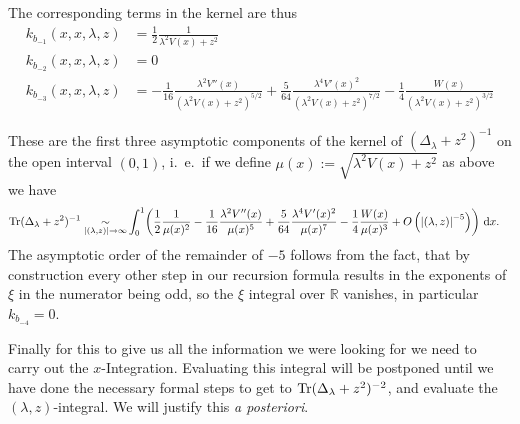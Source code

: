 The corresponding terms in the kernel are thus
\begin{align}
  k_{b_{-1}}(x,x,\lambda,z) &= \frac{1}{2} \frac{1}{\lambda^2 V(x) + z^2} \\
  k_{b_{-2}}(x,x,\lambda,z) &= 0 \\
  k_{b_{-3}}(x,x,\lambda,z) &= - \frac{1}{16} \frac{\lambda^2 V''(x)}{(\lambda^2
    V(x) + z^2)^{5/2}} + \frac{5}{64} \frac{\lambda^4 V'(x)^2}{(\lambda^2V(x)
    + z^2)^{7/2}} -\frac{1}{4}\frac{W(x)}{(\lambda^2 V(x) + z^2)^{3/2}}
  \label{eqn:coeff-kernel}
\end{align}

These are the first three asymptotic components of the kernel of
$(\Delta_\lambda + z^2)^{-1}$ on the open interval $(0,1)$, i.~e.\ if we define
$\mu(x) := \sqrt{\lambda^2 V(x) + z^2}$ as above we have
\begin{align*}
  \Tr(\Delta_\lambda + z^2)^{-1} \SimAs{\Abs{(\lambda, z)}\to\infty}&
   \Int{x}{\left(
      \frac12\frac1{\mu(x)^{2}}
     -\frac1{16}\frac{\lambda^2 V''(x)}{\mu(x)^5}
     +\frac{5}{64}\frac{\lambda^4V'(x)^2}{\mu(x)^7}
     -\frac14\frac{W(x)}{\mu(x)^3}
     +O\left(\Abs{(\lambda, z)}^{-5}\right)
   \right)}.
\end{align*}
The asymptotic order of the remainder of $-5$ follows from the fact, that by
construction every other step in our recursion formula results in the exponents
of $\xi$ in the numerator being odd, so the $\xi$ integral over $\mathbb{R}$
vanishes, in particular $k_{b_{-4}} = 0$.

Finally for this to give us all the information we were looking for we need to
carry out the $x$-Integration. Evaluating this integral will be postponed until
we have done the necessary formal steps to get to $\Tr(\Delta_\lambda +
z^2)^{-2}$, and evaluate the $(\lambda,z)$-integral. We will justify this
\textit{a posteriori}.
